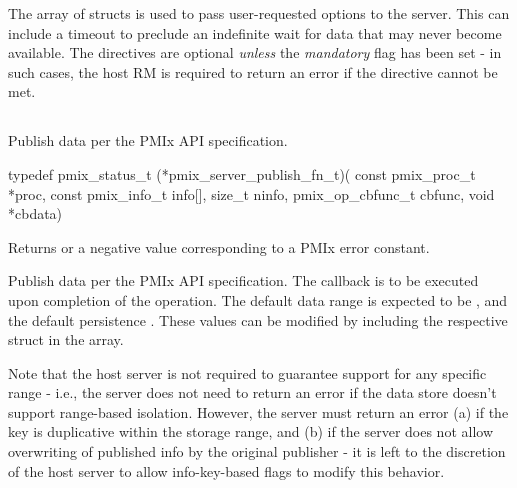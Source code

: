 The array of  structs is used to pass user-requested options to the server.
This can include a timeout to preclude an indefinite wait for data that may never become available.
The directives are optional \emph{unless} the \emph{mandatory} flag has been set - in such cases, the host \ac{RM} is required to return an error if the directive cannot be met.


\subsection{}

\summary

Publish data per the PMIx API specification.

\format

\cspecificstart
\begin{codepar}
typedef pmix_status_t (*pmix_server_publish_fn_t)(
                             const pmix_proc_t *proc,
                             const pmix_info_t info[], size_t ninfo,
                             pmix_op_cbfunc_t cbfunc, void *cbdata)
\end{codepar}
\cspecificend

\begin{arglist}
\end{arglist}

Returns  or a negative value corresponding to a PMIx error constant.

\descr

Publish data per the PMIx API specification.
The callback is to be executed upon completion of the operation.
The default data range is expected to be , and the default persistence .
These values can be modified by including the respective  struct in the  array.

Note that the host server is not required to guarantee support for any specific range - i.e., the server does not need to return an error if the data store doesn't support range-based isolation.
However, the server must return an error (a) if the key is duplicative within the storage range, and (b) if the server does not allow overwriting of published info by the original publisher - it is left to the discretion of the host server to allow info-key-based flags to modify this behavior.

